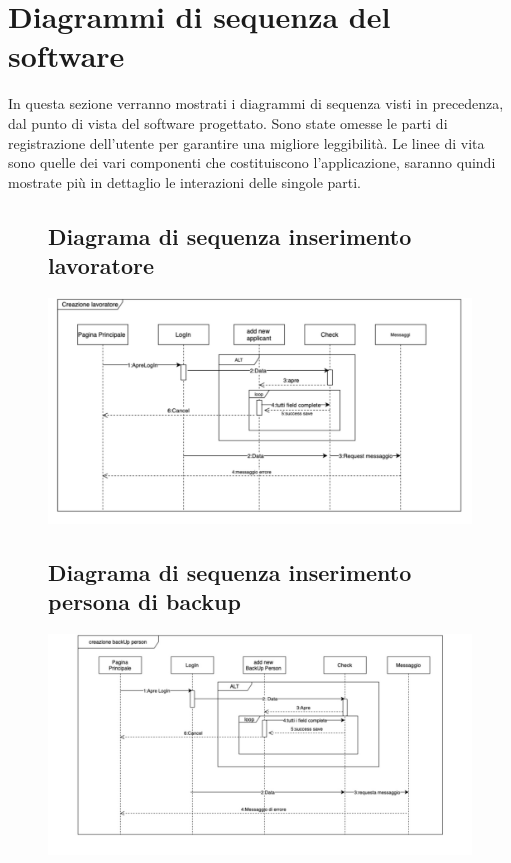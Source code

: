 \documentclass[ 4paper,11pt,openany]{book}
\begin{document}
\section{Diagrammi di sequenza del software}
In questa sezione verranno mostrati i diagrammi di sequenza visti in precedenza, dal punto di vista del software progettato. Sono state omesse le parti di registrazione dell'utente per garantire una migliore leggibilità. Le linee di vita sono quelle dei vari componenti che costituiscono l'applicazione, saranno quindi mostrate più in dettaglio le interazioni delle singole parti.
\begin{figure}[htpb!] 
	\subsection{Diagrama di sequenza inserimento lavoratore}
	\includegraphics[width=180mm]{creazione_Lavoratore.jpeg}
\end{figure}
\begin{figure}[htpb!] 
	\subsection{Diagrama di sequenza inserimento persona di backup}
	\includegraphics[width=180mm]{creazione_Backup.jpeg}
\end{figure}
\end{document}
